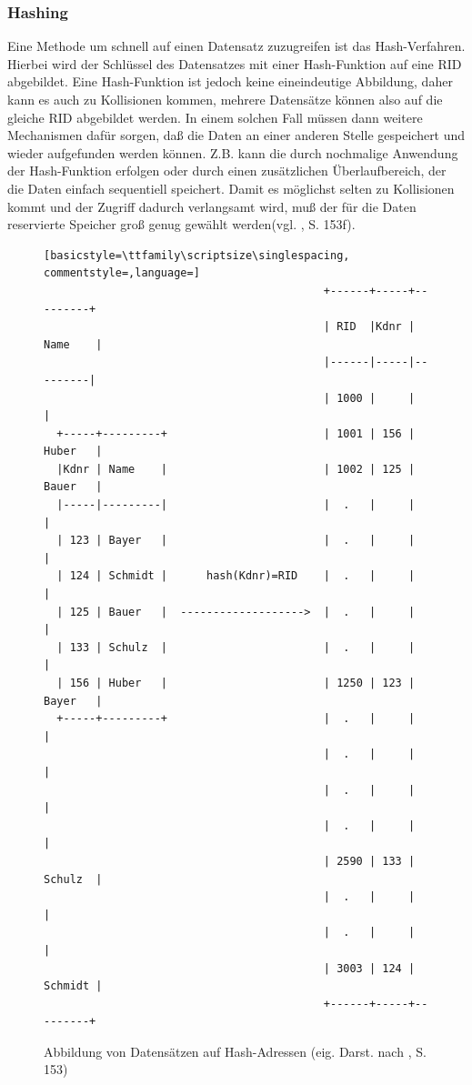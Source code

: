 \subsubsection{Hashing}
Eine Methode um schnell auf einen Datensatz zuzugreifen ist das Hash-Verfahren. Hierbei wird der Schlüssel des Datensatzes mit einer Hash-Funktion auf eine RID abgebildet. Eine Hash-Funktion ist jedoch keine eineindeutige Abbildung, daher kann es auch zu Kollisionen kommen, mehrere Datensätze können also auf die gleiche RID abgebildet werden. In einem solchen Fall müssen dann weitere Mechanismen dafür sorgen, daß die Daten an einer anderen Stelle gespeichert und wieder aufgefunden werden können. Z.B. kann die durch nochmalige Anwendung der Hash-Funktion erfolgen oder durch einen zusätzlichen Überlaufbereich, der die Daten einfach sequentiell speichert. Damit es möglichst selten zu Kollisionen kommt und der Zugriff dadurch verlangsamt wird, muß der für die Daten reservierte Speicher groß genug gewählt werden(vgl. \cite{Sauer1998}, S. 153f).
\begin{figure}[h]
\begin{lstlisting}[basicstyle=\ttfamily\scriptsize\singlespacing, commentstyle=,language=]
                                           +------+-----+---------+
                                           | RID  |Kdnr | Name    |
                                           |------|-----|---------|
                                           | 1000 |     |         |
  +-----+---------+                        | 1001 | 156 | Huber   |
  |Kdnr | Name    |                        | 1002 | 125 | Bauer   |
  |-----|---------|                        |  .   |     |         |
  | 123 | Bayer   |                        |  .   |     |         |
  | 124 | Schmidt |      hash(Kdnr)=RID    |  .   |     |         |
  | 125 | Bauer   |  ------------------->  |  .   |     |         |
  | 133 | Schulz  |                        |  .   |     |         |
  | 156 | Huber   |                        | 1250 | 123 | Bayer   |
  +-----+---------+                        |  .   |     |         |
                                           |  .   |     |         |
                                           |  .   |     |         |
                                           |  .   |     |         |
                                           | 2590 | 133 | Schulz  |
                                           |  .   |     |         |
                                           |  .   |     |         |
                                           | 3003 | 124 | Schmidt |
                                           +------+-----+---------+
\end{lstlisting}
\caption[Abbildung von Datensätzen auf Hash-Adressen]{Abbildung von Datensätzen auf Hash-Adressen (eig. Darst. nach \cite{Sauer1998}, S. 153)}
\label{hash}
\end{figure}
